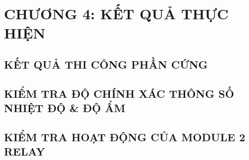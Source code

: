 \section*{CHƯƠNG 4: KẾT QUẢ THỰC HIỆN}
\setcounter{section}{4}
\setcounter{subsection}{0}
\subsection{KẾT QUẢ THI CÔNG PHẦN CỨNG}
\subsection{KIỂM TRA ĐỘ CHÍNH XÁC THÔNG SỐ NHIỆT ĐỘ \& ĐỘ ẨM}
\subsection{KIỂM TRA HOẠT ĐỘNG CỦA MODULE 2 RELAY}